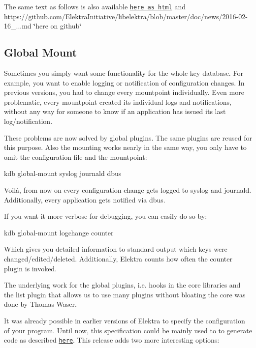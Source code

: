 The same text as follows is also available \href{https://doc.libelektra.org/news/1ab4a560-c286-46d2-a058-1a8e7e208fe8.html}{\tt here as html} and https\+://github.com/\+Elektra\+Initiative/libelektra/blob/master/doc/news/2016-\/02-\/16\+\_...\+md \char`\"{}here on github\char`\"{}

\subsection*{Global Mount}

Sometimes you simply want some functionality for the whole key database. For example, you want to enable logging or notification of configuration changes. In previous versions, you had to change every mountpoint individually. Even more problematic, every mountpoint created its individual logs and notifications, without any way for someone to know if an application has issued its last log/notification.

These problems are now solved by global plugins. The same plugins are reused for this purpose. Also the mounting works nearly in the same way, you only have to omit the configuration file and the mountpoint\+: \begin{DoxyVerb}    kdb global-mount syslog journald dbus
\end{DoxyVerb}


Voilà, from now on every configuration change gets logged to syslog and journald. Additionally, every application gets notified via dbus.

If you want it more verbose for debugging, you can easily do so by\+: \begin{DoxyVerb}    kdb global-mount logchange counter
\end{DoxyVerb}


Which gives you detailed information to standard output which keys were changed/edited/deleted. Additionally, Elektra counts how often the {\ttfamily counter} plugin is invoked.

The underlying work for the global plugins, i.\+e. hooks in the core libraries and the {\ttfamily list} plugin that allows us to use many plugins without bloating the core was done by Thomas Waser.

It was already possible in earlier versions of Elektra to specify the configuration of your program. Until now, this specification could be mainly used to to generate code as described \href{https://github.com/ElektraInitiative/libelektra/tree/master/src/tools/gen}{\tt here}. This release adds two more interesting options\+:


